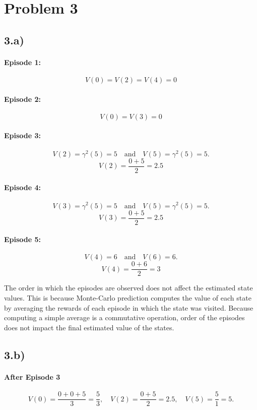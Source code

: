 \documentclass[11pt]{article}
\begin{document}
\newpage
\section*{Problem 3}
\subsection*{3.a)}
\paragraph{Episode 1:}
\[
V(0) = V(2) = V(4) = 0
\]

\paragraph{Episode 2:}
\[
V(0) = V(3) = 0
\]

\paragraph{Episode 3:}
\[
V(2) = \gamma^2(5) = 5
\quad\text{and}\quad
V(5) = \gamma^2(5) = 5.
\]
\[
V(2) = \frac{0 + 5}{2} = 2.5
\]

\paragraph{Episode 4:}
\[
V(3) = \gamma^2(5) = 5
\quad\text{and}\quad
V(5) = \gamma^2(5) = 5.
\]
\[
V(3) = \frac{0 + 5}{2} = 2.5
\]

\paragraph{Episode 5:}
\[
V(4) = 6
\quad\text{and}\quad
V(6) = 6.
\]
\[
V(4) = \frac{0 + 6}{2} = 3
\]

The order in which the episodes are observed does not affect the estimated state values. This is because Monte-Carlo prediction computes the value of
each state by averaging the rewards of each episode in which the state was visited. Because computing a simple average is a commutative operation, order
of the episodes does not impact the final estimated value of the states.

\subsection*{3.b)}

\paragraph{After Episode 3}
\[
V(0) = \frac{0 + 0 + 5}{3} = \frac{5}{3},\quad
V(2) = \frac{0 + 5}{2} = 2.5,\quad
V(5) = \frac{5}{1} = 5.
\]
\end{document}
